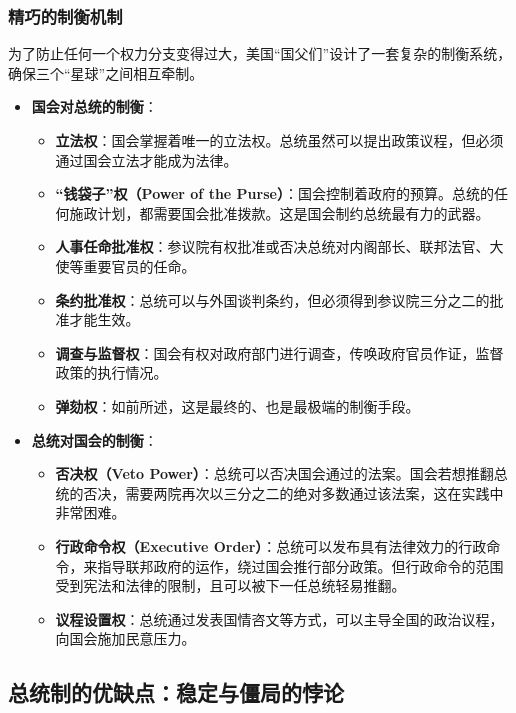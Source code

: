 \subsubsection*{精巧的制衡机制}

为了防止任何一个权力分支变得过大，美国“国父们”设计了一套复杂的制衡系统，确保三个“星球”之间相互牵制。

\begin{itemize}
    \item \textbf{国会对总统的制衡}：
    \begin{itemize}
        \item \textbf{立法权}：国会掌握着唯一的立法权。总统虽然可以提出政策议程，但必须通过国会立法才能成为法律。
        \item \textbf{“钱袋子”权（Power of the Purse）}：国会控制着政府的预算。总统的任何施政计划，都需要国会批准拨款。这是国会制约总统最有力的武器。
        \item \textbf{人事任命批准权}：参议院有权批准或否决总统对内阁部长、联邦法官、大使等重要官员的任命。
        \item \textbf{条约批准权}：总统可以与外国谈判条约，但必须得到参议院三分之二的批准才能生效。
        \item \textbf{调查与监督权}：国会有权对政府部门进行调查，传唤政府官员作证，监督政策的执行情况。
        \item \textbf{弹劾权}：如前所述，这是最终的、也是最极端的制衡手段。
    \end{itemize}
    \item \textbf{总统对国会的制衡}：
    \begin{itemize}
        \item \textbf{否决权（Veto Power）}：总统可以否决国会通过的法案。国会若想推翻总统的否决，需要两院再次以三分之二的绝对多数通过该法案，这在实践中非常困难。
        \item \textbf{行政命令权（Executive Order）}：总统可以发布具有法律效力的行政命令，来指导联邦政府的运作，绕过国会推行部分政策。但行政命令的范围受到宪法和法律的限制，且可以被下一任总统轻易推翻。
        \item \textbf{议程设置权}：总统通过发表国情咨文等方式，可以主导全国的政治议程，向国会施加民意压力。
    \end{itemize}
\end{itemize}

\subsection{总统制的优缺点：稳定与僵局的悖论}

